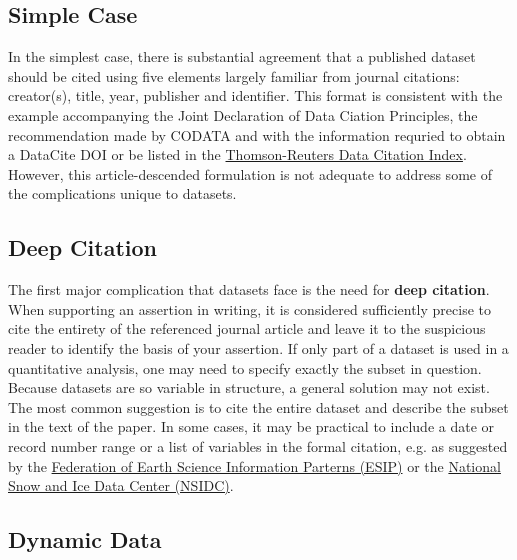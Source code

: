 \documentclass[10pt,twocolumn]{article}
\begin{document}
\subsection*{Simple Case}\label{simple-case}

In the simplest case, there is substantial agreement that a published dataset should be cited using five elements largely familiar from journal citations: creator(s), title, year, publisher and identifier.
This format is consistent with the example accompanying the Joint Declaration of Data Ciation Principles, the recommendation made by CODATA\cite{codata-icsti_task_group_on_data_citation_standards_and_practices_out_2013} and with the information requried to obtain a DataCite DOI\cite{datacite_datacite_2013} or be listed in the \href{http://thomsonreuters.com/data-citation-index/}{Thomson-Reuters Data Citation Index}.
However, this article-descended formulation is not adequate to address some of the complications unique to datasets.

\subsection*{Deep Citation}\label{deep-citation}

The first major complication that datasets face is the need for \textbf{deep citation}.
When supporting an assertion in writing, it is considered sufficiently precise to cite the entirety of the referenced journal article and leave it to the suspicious reader to identify the basis of your assertion.
If only part of a dataset is used in a quantitative analysis, one may need to specify exactly the subset in question.
Because datasets are so variable in structure, a general solution may not exist.
The most common suggestion is to cite the entire dataset and describe the subset in the text of the paper.\cite{altman_a_2007,}
In some cases, it may be practical to include a date or record number range or a list of variables in the formal citation, e.g. as suggested by the  \href{http://wiki.esipfed.org/index.php/Interagency_Data_Stewardship/Citations/provider_guidelines#Subset_Used}{Federation of Earth Science Information Parterns (ESIP)} or the \href{http://nsidc.org/about/use_copyright.html}{National Snow and Ice Data Center (NSIDC)}.

\subsection*{Dynamic Data}\label{dynamic-data}
\end{document}
